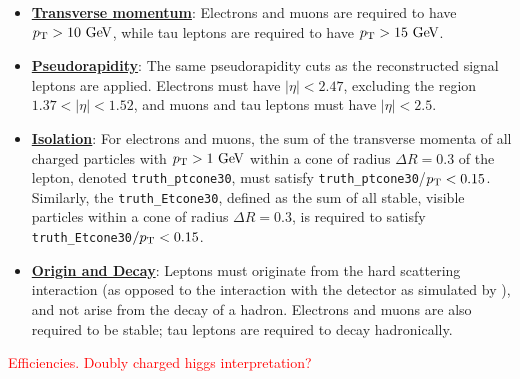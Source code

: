 \begin{itemize}
	\item \underline{\textbf{Transverse momentum}}: Electrons and muons are required to have $\pt>10 \GeV$, while tau leptons are required to have $\pt>15 \GeV$.
	\item \underline{\textbf{Pseudorapidity}}: The same pseudorapidity cuts as the reconstructed signal leptons are applied. Electrons must have $|\eta|<2.47$, excluding the region $1.37<|\eta|<1.52$, and muons and tau leptons must have $|\eta|<2.5$.
	\item \underline{\textbf{Isolation}}: For electrons and muons, the sum of the transverse momenta of all charged particles with $\pt>1 \GeV$ within a cone of radius $\Delta R=0.3$ of the lepton, denoted \texttt{truth\_ptcone30}, must satisfy \texttt{truth\_ptcone30}/$p_{\text{T}}<0.15$. Similarly, the \texttt{truth\_Etcone30}, defined as the sum of all stable, visible particles within a cone of radius $\Delta R=0.3$, is required to satisfy \texttt{truth\_Etcone30}$/p_{\text{T}}<0.15$.
	\item \underline{\textbf{Origin and Decay}}: Leptons must originate from the hard scattering interaction (as opposed to the interaction with the detector as simulated by \geant), and not arise from the decay of a hadron. Electrons and muons are also required to be stable; tau leptons are required to decay hadronically. 
\end{itemize}

\textcolor{red}{Efficiencies. Doubly charged higgs interpretation?}